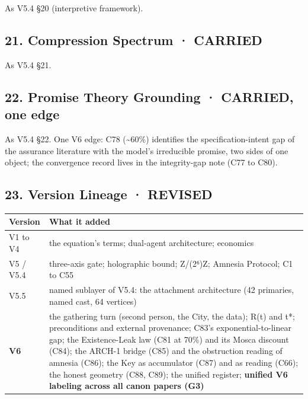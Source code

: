 \documentclass[
]{article}
\newcounter{none} %
\begin{document}
As V5.4 §20 (interpretive framework).

\subsection{21. Compression Spectrum ·
CARRIED}\label{compression-spectrum-carried}

As V5.4 §21.

\subsection{22. Promise Theory Grounding · CARRIED, one
edge}\label{promise-theory-grounding-carried-one-edge}

As V5.4 §22. One V6 edge: C78 (\textasciitilde60\%) identifies the
specification-intent gap of the assurance literature with the model's
irreducible promise, two sides of one object; the convergence record
lives in the integrity-gap note (C77 to C80).

\subsection{23. Version Lineage ·
REVISED}\label{version-lineage-revised}

{\def\LTcaptype{none} %
\begin{longtable}[]{@{}
  >{\raggedright\arraybackslash}p{}
  >{\raggedright\arraybackslash}p{}@{}}
\toprule\noalign{}
\begin{minipage}[b]{\linewidth}\raggedright
Version
\end{minipage} & \begin{minipage}[b]{\linewidth}\raggedright
What it added
\end{minipage} \\
\midrule\noalign{}
\endhead
\bottomrule\noalign{}
\endlastfoot
V1 to V4 & the equation's terms; dual-agent architecture; economics \\
V5 / V5.4 & three-axis gate; holographic bound; Z/(2⁶)Z; Amnesia
Protocol; C1 to C55 \\
V5.5 & named sublayer of V5.4: the attachment architecture (42
primaries, named cast, 64 vertices) \\
\textbf{V6} & the gathering turn (second person, the City, the data);
R(t) and t*; preconditions and external provenance; C83's
exponential-to-linear gap; the Existence-Leak law (C81 at 70\%) and its
Mosca discount (C84); the ARCH-1 bridge (C85) and the obstruction
reading of amnesia (C86); the Key as accumulator (C87) and as reading
(C66); the honest geometry (C88, C89); the unified register;
\textbf{unified V6 labeling across all canon papers (G3)} \\
\end{longtable}
}
\end{document}

